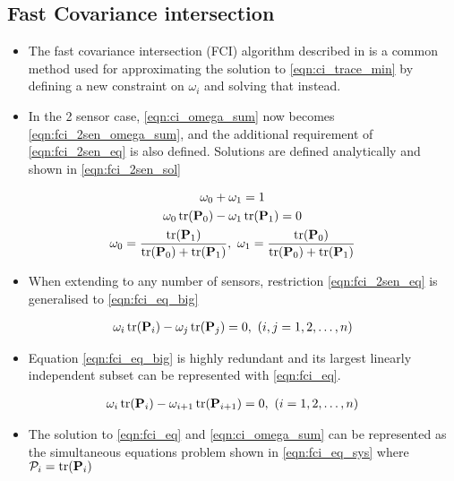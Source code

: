 \documentclass[letterpaper, 10 pt, conference]{ieeeconf}  %
\begin{document}
\subsection{Fast Covariance intersection}
\begin{itemize}
   \item The fast covariance intersection (FCI) algorithm described in \cite{niehsenInformationFusionBased2002} is a common method used for approximating the solution to \eqref{eqn:ci_trace_min} by defining a new constraint on $\omega_i$ and solving that instead.
   \item In the 2 sensor case, \eqref{eqn:ci_omega_sum} now becomes \eqref{eqn:fci_2sen_omega_sum}, and the additional requirement of \eqref{eqn:fci_2sen_eq} is also defined. Solutions are defined analytically and shown in \eqref{eqn:fci_2sen_sol}
\end{itemize}
\begin{gather}
   \omega_0 + \omega_1 = 1 \label{eqn:fci_2sen_omega_sum}\\
   \omega_0 \operatorname{tr}({{\mathbf{P}}}_0) - \omega_1 \operatorname{tr}({{\mathbf{P}}}_1) = 0 \label{eqn:fci_2sen_eq}\\
   \omega_0 = \frac{\operatorname{tr}({{\mathbf{P}}}_1)}{\operatorname{tr}({{\mathbf{P}}}_0)+\operatorname{tr}({{\mathbf{P}}}_1)},\ \omega_1 = \frac{\operatorname{tr}({{\mathbf{P}}}_0)}{\operatorname{tr}({{\mathbf{P}}}_0)+\operatorname{tr}({{\mathbf{P}}}_1)} \label{eqn:fci_2sen_sol}
\end{gather}
\begin{itemize}
   \item When extending to any number of sensors, restriction \eqref{eqn:fci_2sen_eq} is generalised to \eqref{eqn:fci_eq_big}
\end{itemize}
\begin{gather}
   \omega_i \operatorname{tr}({{\mathbf{P}}}_i) - \omega_j \operatorname{tr}({{\mathbf{P}}}_j) = 0,\ (i,j=1,2,\dots,n) \label{eqn:fci_eq_big}
\end{gather}
\begin{itemize}
   \item Equation \eqref{eqn:fci_eq_big} is highly redundant and its largest linearly independent subset can be represented with \eqref{eqn:fci_eq}.
\end{itemize}
\begin{gather}
   \omega_i \tr(\mP_i) - \omega_{i+1} \tr(\mP_{i+1}) = 0,\ (i=1,2,\dots,n) \label{eqn:fci_eq}
\end{gather}
\begin{itemize}
   \item The solution to \eqref{eqn:fci_eq} and \eqref{eqn:ci_omega_sum} can be represented as the simultaneous equations problem shown in \eqref{eqn:fci_eq_sys} where $\mathcal{P}_i = \operatorname{tr}({{\mathbf{P}}}_i)$
\end{itemize}
\end{document}
